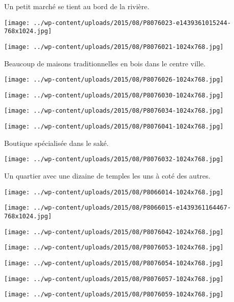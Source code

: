 \pagebreak
 Un petit marché se tient au bord de la rivière. 
\begin{center} \texttt{[image: ../wp-content/uploads/2015/08/P8076023-e1439361015244-768x1024.jpg]} \end{center}
\begin{center} \texttt{[image: ../wp-content/uploads/2015/08/P8076021-1024x768.jpg]} \end{center}

 Beaucoup de maisons traditionnelles en bois dans le centre ville. 
\begin{center} \texttt{[image: ../wp-content/uploads/2015/08/P8076026-1024x768.jpg]} \end{center}
\begin{center} \texttt{[image: ../wp-content/uploads/2015/08/P8076030-1024x768.jpg]} \end{center}
\begin{center} \texttt{[image: ../wp-content/uploads/2015/08/P8076034-1024x768.jpg]} \end{center}
\begin{center} \texttt{[image: ../wp-content/uploads/2015/08/P8076041-1024x768.jpg]} \end{center}

\pagebreak
 Boutique spécialisée dans le saké. 
\begin{center} \texttt{[image: ../wp-content/uploads/2015/08/P8076032-1024x768.jpg]} \end{center}

  Un quartier avec une dizaine de temples les uns à coté des autres. 
\begin{center} \texttt{[image: ../wp-content/uploads/2015/08/P8066014-1024x768.jpg]} \end{center}
\begin{center} \texttt{[image: ../wp-content/uploads/2015/08/P8066015-e1439361164467-768x1024.jpg]} \end{center}
\begin{center} \texttt{[image: ../wp-content/uploads/2015/08/P8076042-1024x768.jpg]} \end{center}
\begin{center} \texttt{[image: ../wp-content/uploads/2015/08/P8076053-1024x768.jpg]} \end{center}
\begin{center} \texttt{[image: ../wp-content/uploads/2015/08/P8076054-1024x768.jpg]} \end{center}
\begin{center} \texttt{[image: ../wp-content/uploads/2015/08/P8076057-1024x768.jpg]} \end{center}
\begin{center} \texttt{[image: ../wp-content/uploads/2015/08/P8076059-1024x768.jpg]} \end{center}

